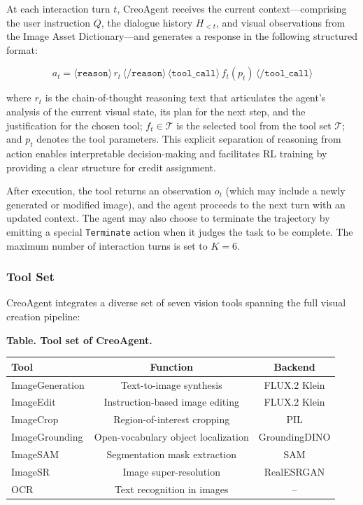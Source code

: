 \documentclass[11pt]{article}
\begin{document}
At each interaction turn $t$, CreoAgent receives the current context—comprising the user instruction $Q$, the dialogue history $H_{<t}$, and visual observations from the Image Asset Dictionary—and generates a response in the following structured format:

$$a_t = \langle \texttt{reason} \rangle \, r_t \, \langle \texttt{/reason} \rangle \, \langle \texttt{tool\_call} \rangle \, f_t(p_t) \, \langle \texttt{/tool\_call} \rangle$$

where $r_t$ is the chain-of-thought reasoning text that articulates the agent's analysis of the current visual state, its plan for the next step, and the justification for the chosen tool; $f_t \in \mathcal{T}$ is the selected tool from the tool set $\mathcal{T}$; and $p_t$ denotes the tool parameters. This explicit separation of reasoning from action enables interpretable decision-making and facilitates RL training by providing a clear structure for credit assignment.

After execution, the tool returns an observation $o_t$ (which may include a newly generated or modified image), and the agent proceeds to the next turn with an updated context. The agent may also choose to terminate the trajectory by emitting a special \texttt{Terminate} action when it judges the task to be complete. The maximum number of interaction turns is set to $K=6$.

\subsubsection{Tool Set}

CreoAgent integrates a diverse set of seven vision tools spanning the full visual creation pipeline:

\textbf{Table. Tool set of CreoAgent.}

\begin{table}[t]
\centering
\begin{tabular}{lcc}
\toprule
\textbf{Tool} & \textbf{Function} & \textbf{Backend} \\
\midrule
ImageGeneration & Text-to-image synthesis & FLUX.2 Klein \\
ImageEdit & Instruction-based image editing & FLUX.2 Klein \\
ImageCrop & Region-of-interest cropping & PIL \\
ImageGrounding & Open-vocabulary object localization & GroundingDINO \\
ImageSAM & Segmentation mask extraction & SAM \\
ImageSR & Image super-resolution & RealESRGAN \\
OCR & Text recognition in images & -- \\
\bottomrule
\end{tabular}
\end{table}
\end{document}
